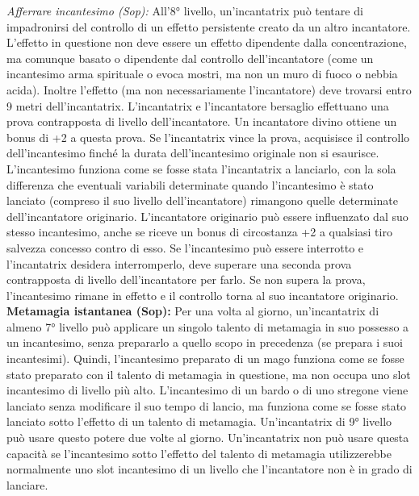 \documentclass[a4paper]{report}
\begin{document}
\begin{multicols}{2}
\textit{Afferrare incantesimo (Sop):} All'8° livello, un'incantatrix può tentare di impadronirsi del controllo di un effetto persistente creato da un altro incantatore. L'effetto in questione non deve essere un effetto dipendente dalla concentrazione, ma comunque basato o dipendente dal controllo dell'incantatore (come un incantesimo arma spirituale o evoca mostri, ma non un muro di fuoco o nebbia acida). Inoltre l'effetto (ma non necessariamente l'incantatore) deve trovarsi entro 9 metri dell'incantatrix. L'incantatrix e l'incantatore bersaglio effettuano una prova contrapposta di livello dell'incantatore. Un incantatore divino ottiene un bonus di +2 a questa prova. Se l'incantatrix vince la prova, acquisisce il controllo dell'incantesimo finché la durata dell'incantesimo originale non si esaurisce. L'incantesimo funziona come se fosse stata l'incantatrix a lanciarlo, con la sola differenza che eventuali variabili determinate quando l'incantesimo è stato lanciato (compreso il suo livello dell'incantatore) rimangono quelle determinate dell'incantatore originario. L'incantatore originario può essere influenzato dal suo stesso incantesimo, anche se riceve un bonus di circostanza +2 a qualsiasi tiro salvezza concesso contro di esso. Se l'incantesimo può essere interrotto e l'incantatrix desidera interromperlo, deve superare una seconda prova contrapposta di livello dell'incantatore per farlo. Se non supera la prova, l'incantesimo rimane in effetto e il controllo torna al suo incantatore originario.\\

\textbf{Metamagia istantanea (Sop):} Per una volta al giorno, un'incantatrix di almeno 7° livello può applicare un singolo talento di metamagia in suo possesso a un incantesimo, senza prepararlo a quello scopo in precedenza (se prepara i suoi incantesimi). Quindi, l'incantesimo preparato di un mago funziona come se fosse stato preparato con il talento di metamagia in questione, ma non occupa uno slot incantesimo di livello più alto. L'incantesimo di un bardo o di uno stregone viene lanciato senza modificare il suo tempo di lancio, ma funziona come se fosse stato lanciato sotto l'effetto di un talento di metamagia. Un'incantatrix di 9° livello può usare questo potere due volte al giorno. Un'incantatrix non può usare questa capacità se l'incantesimo sotto l'effetto del talento di metamagia utilizzerebbe normalmente uno slot incantesimo di un livello che l'incantatore non è in grado di lanciare.\\


\end{multicols}
\end{document}
